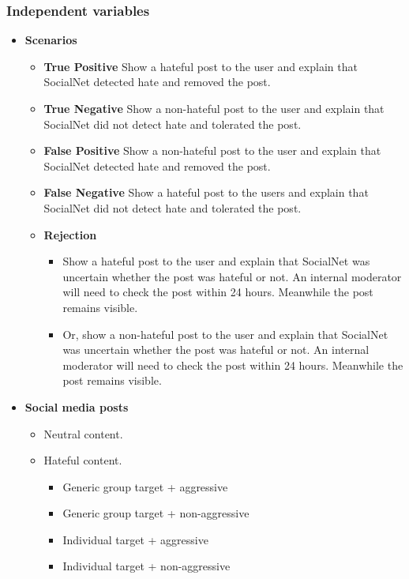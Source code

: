 \documentclass[a4paper]{article}
\begin{document}
\subsubsection{Independent variables}
\begin{itemize}
    \item \textbf{Scenarios}
          \begin{itemize}
              \item \textbf{True Positive} Show a hateful post to the user and explain that SocialNet detected hate and removed the post.
              \item \textbf{True Negative} Show a non-hateful post to the user and explain that SocialNet did not detect hate and tolerated the post.
              \item \textbf{False Positive} Show a non-hateful post to the user and explain that SocialNet detected hate and removed the post.
              \item \textbf{False Negative} Show a hateful post to the users and explain that SocialNet did not detect hate and tolerated the post.
              \item \textbf{Rejection}
                    \begin{itemize}
                        \item Show a hateful post to the user and explain that SocialNet was uncertain whether the post was hateful or not. An internal moderator will need to check the post within 24 hours. Meanwhile the post remains visible.
                        \item Or, show a non-hateful post to the user and explain that SocialNet was uncertain whether the post was hateful or not. An internal moderator will need to check the post within 24 hours. Meanwhile the post remains visible.
                    \end{itemize}
          \end{itemize}

    \item \textbf{Social media posts}
          \begin{itemize}
              \item Neutral content.
              \item Hateful content.\begin{itemize}
                        \item Generic group target + aggressive
                        \item Generic group target + non-aggressive
                        \item Individual target + aggressive
                        \item Individual target + non-aggressive
                    \end{itemize}
          \end{itemize}
\end{itemize}
\end{document}
